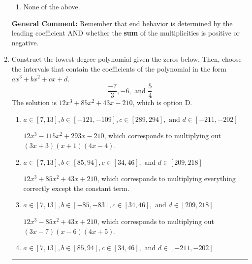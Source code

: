 \documentclass{extbook}[14pt]
\newcommand{\litem}[1]{\item #1

\rule{\textwidth}{0.4pt}}
\begin{document}
\begin{enumerate}
{\begin{enumerate}[label=\Alph*.]
\item None of the above.\end{enumerate}
\textbf{General Comment:} Remember that end behavior is determined by the leading coefficient AND whether the \textbf{sum} of the multiplicities is positive or negative.
}
\litem{
Construct the lowest-degree polynomial given the zeros below. Then, choose the intervals that contain the coefficients of the polynomial in the form $ax^3+bx^2+cx+d$.
\[ \frac{-7}{3}, -6, \text{ and } \frac{5}{4} \]
The solution is \( 12x^{3} +85 x^{2} +43 x -210 \), which is option D.\begin{enumerate}[label=\Alph*.]
\item \( a \in [7, 13], b \in [-121, -109], c \in [289, 294], \text{ and } d \in [-211, -202] \)

$12x^{3} -115 x^{2} +293 x -210$, which corresponds to multiplying out $(3x + 3)(x + 1)(4x -4)$.
\item \( a \in [7, 13], b \in [85, 94], c \in [34, 46], \text{ and } d \in [209, 218] \)

$12x^{3} +85 x^{2} +43 x + 210$, which corresponds to multiplying everything correctly except the constant term.
\item \( a \in [7, 13], b \in [-85, -83], c \in [34, 46], \text{ and } d \in [209, 218] \)

$12x^{3} -85 x^{2} +43 x + 210$, which corresponds to multiplying out $(3x -7)(x -6)(4x + 5)$.
\item \( a \in [7, 13], b \in [85, 94], c \in [34, 46], \text{ and } d \in [-211, -202] \)


\end{enumerate}}
\end{enumerate}
\end{document}
